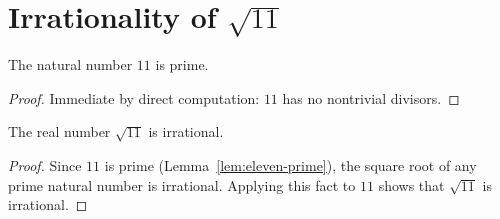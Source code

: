 
\section{Irrationality of \texorpdfstring{$\sqrt{11}$}{sqrt(11)}}

\begin{lemma}[$11$ is prime]
    \label{lem:eleven-prime}
    \leanok
    The natural number $11$ is prime.
\end{lemma}
\begin{proof}
    Immediate by direct computation: $11$ has no nontrivial divisors.
\end{proof}

\begin{theorem}
    \label{thm:irrational-sqrt-eleven}
    \leanok
    The real number $\sqrt{11}$ is irrational.
\end{theorem}
\begin{proof}
    Since $11$ is prime (Lemma~\ref{lem:eleven-prime}), the square root of any prime
    natural number is irrational. Applying this fact to $11$ shows that $\sqrt{11}$ is
    irrational.
\end{proof}
